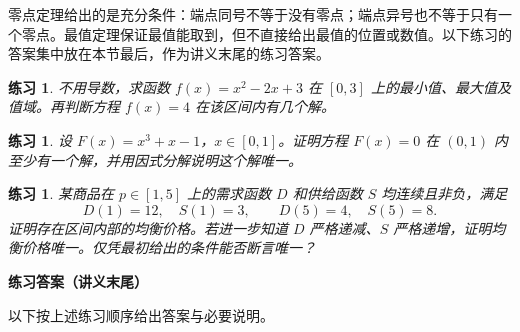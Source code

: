 \documentclass[UTF8,fontset=fandol,11pt]{ctexart}
\newtheorem{exercise}[definition]{练习}
\begin{document}
零点定理给出的是充分条件：端点同号不等于没有零点；端点异号也不等于只有一个零点。最值定理保证最值能取到，但不直接给出最值的位置或数值。以下练习的答案集中放在本节最后，作为讲义末尾的练习答案。\par
\begin{exercise}
\label{mathagent:exercise:8df9c883175539781c5297e80328cb621961e5226b4ee75741c01793ba96210d}
不用导数，求函数 $f(x)=x^2-2x+3$ 在 $[0,3]$ 上的最小值、最大值及值域。再判断方程 $f(x)=4$ 在该区间内有几个解。
\end{exercise}
\begin{exercise}
\label{mathagent:exercise:15f24ef1d79299958d598c18e2c5f872d77ddb70db01666a2348f05d38173ea8}
设 $F(x)=x^3+x-1$，$x\in[0,1]$。证明方程 $F(x)=0$ 在 $(0,1)$ 内至少有一个解，并用因式分解说明这个解唯一。
\end{exercise}
\begin{exercise}
\label{mathagent:exercise:14eff0c9afb4ff01b5d129f61082fbaf47f00da9185eedc3ed8874ad925b6e49}
某商品在 $p\in[1,5]$ 上的需求函数 $D$ 和供给函数 $S$ 均连续且非负，满足
\[
D(1)=12,\quad S(1)=3,\qquad D(5)=4,\quad S(5)=8.
\]
证明存在区间内部的均衡价格。若进一步知道 $D$ 严格递减、$S$ 严格递增，证明均衡价格唯一。仅凭最初给出的条件能否断言唯一？
\end{exercise}
\textbf{练习答案（讲义末尾）}

以下按上述练习顺序给出答案与必要说明。\par
\end{document}
